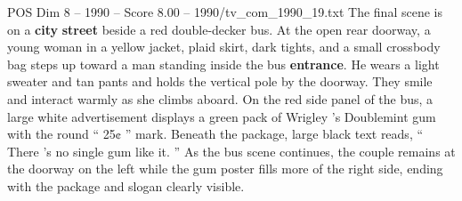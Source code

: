 \begin{textsample}{POS Dim 8 – 1990 – Score 8.00 – 1990/tv\_com\_1990\_19.txt}
The final scene is on a \textbf{city} \textbf{street} beside a red double-decker bus.
At the open rear doorway, a young woman in a yellow jacket, plaid skirt, dark tights, and a small crossbody bag steps up toward a man standing inside the bus \textbf{entrance}.
He wears a light sweater and tan pants and holds the vertical pole by the doorway.
They smile and interact warmly as she climbs aboard.
On the red side panel of the bus, a large white advertisement displays a green pack of Wrigley ’s Doublemint gum with the round “ 25¢ ” mark.
Beneath the package, large black text reads, “ There ’s no single gum like it. ” As the bus scene continues, the couple remains at the doorway on the left while the gum poster fills more of the right side, ending with the package and slogan clearly visible.

\end{textsample}
